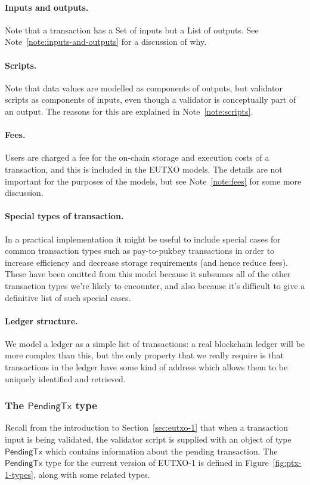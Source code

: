 \documentclass[a4paper]{article}
\newcounter{note}
\newcommand{\s}{\textsf}  %
\newcommand{\ptx}{\ensuremath{\s{PendingTx}}}
\begin{document}
\paragraph{Inputs and outputs. } Note that a transaction has a
\textsf{Set} of inputs but a \textsf{List} of outputs. See
Note~\ref{note:inputs-and-outputs} for a discussion of why.

\paragraph{Scripts.} Note that data values are modelled as components
of outputs, but validator scripts as components of inputs, even though
a validator is conceptually part of an output.  The reasons for this
are explained in Note~\ref{note:scripts}.

\paragraph{Fees.}  Users are charged a fee for the on-chain storage
and execution costs of a transaction, and this is included in the
EUTXO models.  The details are not important for the purposes of the
models, but see Note~\ref{note:fees} for some more discussion.

\paragraph{Special types of transaction.} In a practical
implementation it might be useful to include special cases for common
transaction types such as pay-to-pukbey transactions in order to
increase efficiency and decrease storage requirements (and hence
reduce fees).  These have been omitted from this model because it
subsumes all of the other transaction types we're likely to encounter,
and also because it's difficult to give a definitive list of such
special cases.

\paragraph{Ledger structure.} We model a ledger as a simple
list of transactions: a real blockchain ledger will be more complex
than this, but the only property that we really require is that
transactions in the ledger have some kind of address which allows them
to be uniquely identified and retrieved.

\subsubsection{The \ptx{} type}
\label{sec:pendingtx}
Recall from the introduction to Section~\ref{sec:eutxo-1} that when a
transaction input is being validated, the validator script is supplied
with an object of type \ptx{} which contains information about the
pending transaction.  The \ptx{} type for the current version of
EUTXO-1 is defined in Figure~\ref{fig:ptx-1-types}, along with some
related types.
\end{document}
